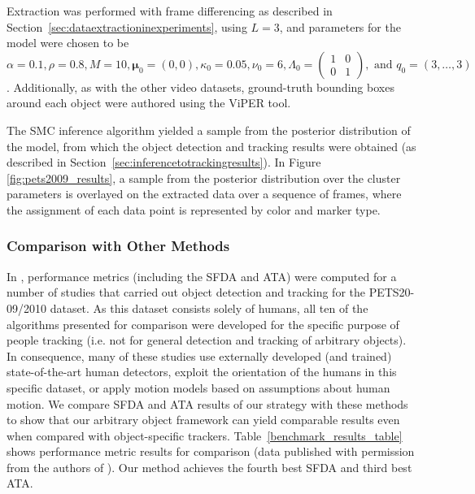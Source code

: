 \documentclass{article}
\begin{document}
Extraction was performed with frame differencing as described in Section~\ref{sec:dataextractioninexperiments}, using $L=3$, and parameters for the model were chosen to be $\alpha = 0.1, \rho = 0.8, M = 10, \boldsymbol{\mu}_{0} = (0,0), \kappa_{0} = 0.05, \nu_{0} = 6, \Lambda_{0} = \left( \begin{smallmatrix} 1&0\\ 0&1 \end{smallmatrix} \right), \text{ and } q_{0} = (3, \ldots, 3)$. Additionally, as with the other video datasets, ground-truth bounding boxes around each object were authored using the ViPER tool.

The SMC inference algorithm yielded a sample from the posterior distribution of the model, from which the object detection and tracking results were obtained (as described in Section~\ref{sec:inferencetotrackingresults}). In Figure \ref{fig:pets2009_results}, a sample from the posterior distribution over the cluster parameters is overlayed on the extracted data over a sequence of frames, where the assignment of each data point is represented by color and marker type.


\subsubsection{Comparison with Other Methods}
\label{sec:comparisonwithothermethods}

In \cite{ellis_2010}, performance metrics (including the SFDA and ATA) were computed for a number of studies that carried out object detection and tracking for the PETS20-\\09/2010 dataset. As this dataset consists solely of humans, all ten of the algorithms presented for comparison were developed for the specific purpose of people tracking (i.e. not for general detection and tracking of arbitrary objects). In consequence, many of these studies use externally developed (and trained) state-of-the-art human detectors, exploit the orientation of the humans in this specific dataset, or apply motion models based on assumptions about human motion. We compare SFDA and ATA results of our strategy with these methods to show that our arbitrary object framework can yield comparable results even when compared with object-specific trackers. Table~\ref{benchmark_results_table} shows performance metric results for comparison (data published with permission from the authors of \cite{ellis_2010}). Our method achieves the fourth best SFDA and third best ATA.
\end{document}
